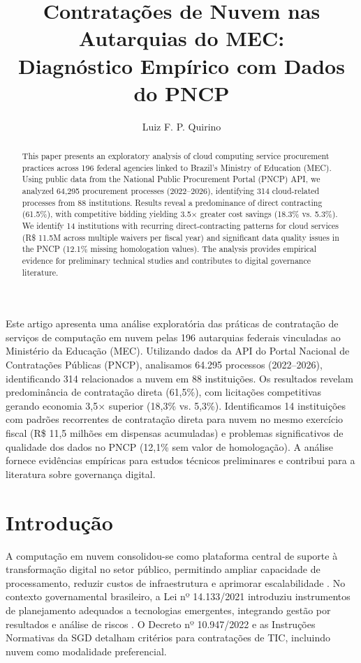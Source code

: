 \documentclass[12pt]{article}
\title{Contratações de Nuvem nas Autarquias do MEC:\\Diagnóstico Empírico com Dados do PNCP}
\author{Luiz F. P. Quirino\inst{1}}
\begin{document}
\maketitle

\begin{abstract}
This paper presents an exploratory analysis of cloud computing service procurement practices across 196 federal agencies linked to Brazil's Ministry of Education (MEC). Using public data from the National Public Procurement Portal (PNCP) API, we analyzed 64,295 procurement processes (2022--2026), identifying 314 cloud-related processes from 88 institutions. Results reveal a predominance of direct contracting (61.5\%), with competitive bidding yielding 3.5$\times$ greater cost savings (18.3\% vs. 5.3\%). We identify 14 institutions with recurring direct-contracting patterns for cloud services (R\$ 11.5M across multiple waivers per fiscal year) and significant data quality issues in the PNCP (12.1\% missing homologation values). The analysis provides empirical evidence for preliminary technical studies and contributes to digital governance literature.
\end{abstract}

\begin{resumo}
Este artigo apresenta uma análise exploratória das práticas de contratação de serviços de computação em nuvem pelas 196 autarquias federais vinculadas ao Ministério da Educação (MEC). Utilizando dados da API do Portal Nacional de Contratações Públicas (PNCP), analisamos 64.295 processos (2022--2026), identificando 314 relacionados a nuvem em 88 instituições. Os resultados revelam predominância de contratação direta (61,5\%), com licitações competitivas gerando economia 3,5$\times$ superior (18,3\% vs. 5,3\%). Identificamos 14 instituições com padrões recorrentes de contratação direta para nuvem no mesmo exercício fiscal (R\$ 11,5 milhões em dispensas acumuladas) e problemas significativos de qualidade dos dados no PNCP (12,1\% sem valor de homologação). A análise fornece evidências empíricas para estudos técnicos preliminares e contribui para a literatura sobre governança digital.
\end{resumo}

\section{Introdução}
\label{sec:intro}

A computação em nuvem consolidou-se como plataforma central de suporte à transformação digital no setor público, permitindo ampliar capacidade de processamento, reduzir custos de infraestrutura e aprimorar escalabilidade \cite{mell2011nist}. No contexto governamental brasileiro, a Lei nº 14.133/2021 introduziu instrumentos de planejamento adequados a tecnologias emergentes, integrando gestão por resultados e análise de riscos \cite{brasil2021lei14133}. O Decreto nº 10.947/2022 e as Instruções Normativas da SGD detalham critérios para contratações de TIC, incluindo nuvem como modalidade preferencial.
\end{document}
